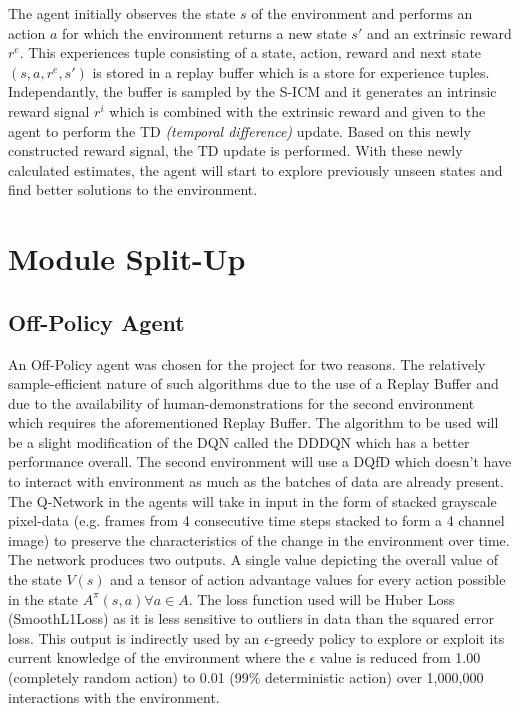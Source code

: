 \documentclass[12pt,a4paper]{article}
\begin{document}
The agent initially observes the state $s$ of the environment and performs an action $a$ 
for which the environment returns a new state $s'$ and an extrinsic reward $r^e$. This experiences
tuple consisting of a state, action, reward and next state  $(s, a, r^e, s')$ is stored in a 
replay buffer which is a store for experience tuples. Independantly, the buffer is sampled 
by the S-ICM and it generates an intrinsic reward signal $r^i$ which is combined with 
the extrinsic reward and given to the agent to perform the TD \textit{(temporal difference)} update.
Based on this newly constructed reward signal, the TD update is performed. With these newly calculated
estimates, the agent will start to explore previously unseen states and find better 
solutions to the environment.

\section{Module Split-Up}

\subsection{Off-Policy Agent}
An Off-Policy agent was chosen for the project for two reasons. The relatively sample-efficient
nature of such algorithms due to the use of a Replay Buffer and due to the availability of 
human-demonstrations for the second environment which requires the aforementioned Replay Buffer.
The algorithm to be used will be a slight modification of the DQN called the DDDQN which has a 
better performance overall. The second environment will use a DQfD which doesn't have to interact with environment
as much as the batches of data are already present. The Q-Network in the agents will take in input in the 
form of stacked grayscale pixel-data (e.g. frames from 4 consecutive time steps stacked to form a 4 channel image) 
to preserve the characteristics of the change in the environment over time. The network produces two outputs. A single
value depicting the overall value of the state $V(s)$ and a tensor of action advantage values for every
action possible in the state $A^\pi(s,a) \forall a \in A$. The loss function used will be Huber Loss 
(SmoothL1Loss) as it is less sensitive to outliers in data than the squared error loss. This output 
is indirectly used by an $\epsilon$-greedy policy
to explore or exploit its current knowledge of the environment where the $\epsilon$ value
is reduced from 1.00 (completely random action) to 0.01 (99\% deterministic action) over 1,000,000
interactions with the environment.
\end{document}
